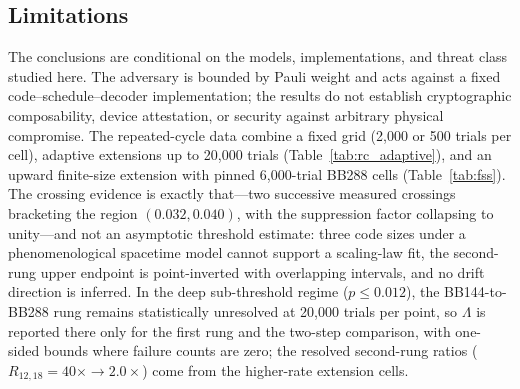 \documentclass[pdflatex,sn-mathphys-num]{sn-jnl}
\theoremstyle{thmstyleone}
\theoremstyle{thmstyletwo}
\theoremstyle{thmstylethree}
\begin{document}
\subsection{Limitations}
\label{sec:limitations}

The conclusions are conditional on the models, implementations, and threat class studied here. The adversary is bounded by Pauli weight and acts against a fixed code--schedule--decoder implementation; the results do not establish cryptographic composability, device attestation, or security against arbitrary physical compromise. The repeated-cycle data combine a fixed grid (2{,}000 or 500 trials per cell), adaptive extensions up to 20{,}000 trials (Table~\ref{tab:rc_adaptive}), and an upward finite-size extension with pinned 6{,}000-trial BB288 cells (Table~\ref{tab:fss}). The crossing evidence is exactly that---two successive measured crossings bracketing the region $(0.032,0.040)$, with the suppression factor collapsing to unity---and not an asymptotic threshold estimate: three code sizes under a phenomenological spacetime model cannot support a scaling-law fit, the second-rung upper endpoint is point-inverted with overlapping intervals, and no drift direction is inferred. In the deep sub-threshold regime ($p\le0.012$), the BB144-to-BB288 rung remains statistically unresolved at 20{,}000 trials per point, so $\Lambda$ is reported there only for the first rung and the two-step comparison, with one-sided bounds where failure counts are zero; the resolved second-rung ratios ($R_{12,18}=40\times\to2.0\times$) come from the higher-rate extension cells.
\end{document}
